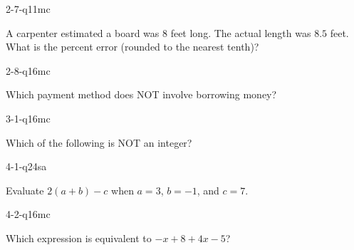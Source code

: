 \begin{practiceQuestion}{2-7-q11}{mc}
\begin{questionText}
A carpenter estimated a board was $8$ feet long. The actual length was $8.5$ feet. What is the percent error (rounded to the nearest tenth)?
\end{questionText}
\end{practiceQuestion}

\begin{practiceQuestion}{2-8-q16}{mc}
\begin{questionText}
Which payment method does NOT involve borrowing money?
\end{questionText}
\end{practiceQuestion}

\begin{practiceQuestion}{3-1-q16}{mc}
\begin{questionText}
Which of the following is NOT an integer?
\end{questionText}
\end{practiceQuestion}

\begin{practiceQuestion}{4-1-q24}{sa}
\begin{questionText}
Evaluate $2(a + b) - c$ when $a = 3$, $b = -1$, and $c = 7$.
\end{questionText}
\end{practiceQuestion}

\begin{practiceQuestion}{4-2-q16}{mc}
\begin{questionText}
Which expression is equivalent to $-x + 8 + 4x - 5$?
\end{questionText}
\end{practiceQuestion}

